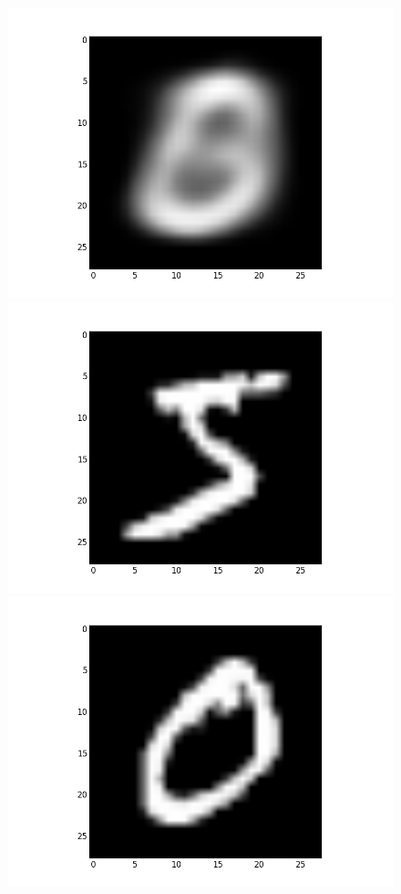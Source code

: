 \documentclass[submit]{harvardml}
\begin{document}
\begin{figure}[ht]
    \centering
    \includegraphics[scale=0.15]{K3-mean-1}
    \includegraphics[scale=0.15]{K3-representative-1-0}
    \includegraphics[scale=0.15]{K3-representative-1-1}

\end{figure}
\end{document}

